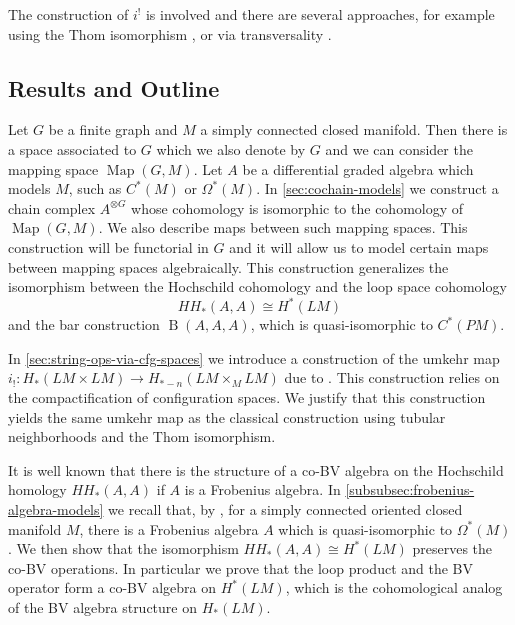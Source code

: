 \documentclass{scrartcl}
\theoremstyle{plain}
\theoremstyle{definition}
\newcommand{\iso}{\cong}
\DeclareMathOperator{\Map}{Map}
\DeclareMathOperator{\BC}{B}
\begin{document}
The construction of $i^!$ is involved and there are several approaches, for example using the Thom isomorphism \cite{cohen2006string}, \cite{hingston2017product} or via transversality \cite{chataur2005bordism}.

\subsection{Results and Outline}

Let $G$ be a finite graph and $M$ a simply connected closed manifold. Then there is a space associated to $G$ which we also denote by $G$ and we can consider the mapping space $\Map(G, M)$. Let $A$ be a differential graded algebra which models $M$, such as $C^*(M)$ or $\Omega^*(M)$. In \cref{sec:cochain-models} we construct a chain complex $A^{\otimes G}$ whose cohomology is isomorphic to the cohomology of $\Map(G, M)$. We also describe maps between such mapping spaces. This construction will be functorial in $G$ and it will allow us to model certain maps between mapping spaces algebraically. This construction generalizes the isomorphism between the Hochschild cohomology and the loop space cohomology $$HH_*(A, A)\iso H^*(LM)$$ and the bar construction $\BC(A, A, A)$, which is quasi-isomorphic to $C^*(PM)$. 


In \cref{sec:string-ops-via-cfg-spaces} we introduce a construction of the umkehr map $i_!\colon H_*(LM\times LM)\to H_{*-n}(LM\times_M LM)$ due to \cite{naef2019string}. This construction relies on the compactification of configuration spaces. We justify that this construction yields the same umkehr map as the classical construction using tubular neighborhoods and the Thom isomorphism. 

It is well known that there is the structure of a co-BV algebra on the Hochschild homology $HH_*(A, A)$ if $A$ is a Frobenius algebra. In \cref{subsubsec:frobenius-algebra-models} we recall that, by \cite{lambrechts2008poincare}, for a simply connected oriented closed manifold $M$, there is a Frobenius algebra $A$ which is quasi-isomorphic to $\Omega^*(M)$. We then show that the isomorphism $HH_*(A, A)\iso H^*(LM)$ preserves the co-BV operations. In particular we prove that the loop product and the BV operator form a co-BV algebra on $H^*(LM)$, which is the cohomological analog of the BV algebra structure on $H_*(LM)$. 
\end{document}
